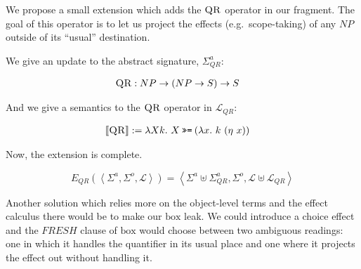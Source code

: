 \documentclass{article}
\newcommand{\hsbind}{\mathbin{\texttt{>>=}}}
\newcommand{\abs}[1]{\textsc{#1}}
\newcommand{\sem}[1]{\llbracket #1 \rrbracket}
\newcommand{\lex}[2]{\sem{\abs{#1}} &:= #2}
\begin{document}
We propose a small extension which adds the $\abs{QR}$ operator in our
fragment. The goal of this operator is to let us project the effects
(e.g.\ scope-taking) of any $NP$ outside of its ``usual'' destination.

We give an update to the abstract signature, $\Sigma^a_{QR}$:

\begin{align*}
  \abs{QR} &: NP \to (NP \to S) \to S
\end{align*}

And we give a semantics to the $\abs{QR}$ operator in $\mathcal{L}_{QR}$:

\begin{align*}
  \lex{QR}{\lambda X k.\ X \hsbind (\lambda x.\ k\ (\eta\ x))}
\end{align*}

Now, the extension is complete.

$$
E_{QR}(\left< \Sigma^a, \Sigma^o, \mathcal{L} \right>) = \left< \Sigma^a \uplus \Sigma^a_{QR}, \Sigma^o, \mathcal{L} \uplus \mathcal{L}_{QR} \right>
$$

Another solution which relies more on the object-level terms and the effect
calculus there would be to make our $\mathrm{box}$ leak. We could introduce
a choice effect and the $FRESH$ clause of $\mathrm{box}$ would choose
between two ambiguous readings: one in which it handles the quantifier in
its usual place and one where it projects the effect out without handling
it.
\end{document}
